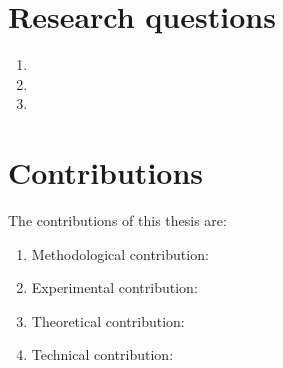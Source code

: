 

\section{Research questions}
\label{intro:definition:rq}


\begin{enumerate}
    \item \rqone

    \item \rqtwo
    
    \item \rqthree
    
\end{enumerate}


\section{Contributions}

The contributions of this thesis are:

\begin{enumerate}[label=(\subscript{C}{{\arabic*}})]
    \item Methodological contribution: \todo{}
    \item Experimental contribution: \todo{}
    \item Theoretical contribution: \todo{}
    \item Technical contribution: \todo{} 
\end{enumerate}

